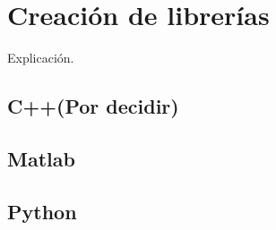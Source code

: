 
\chapter{Creación de librerías\label{chapCreacionDeLibrerias}}

Explicación.


\section{C++(Por decidir)}
\section{Matlab}
\section{Python}


\newpage
